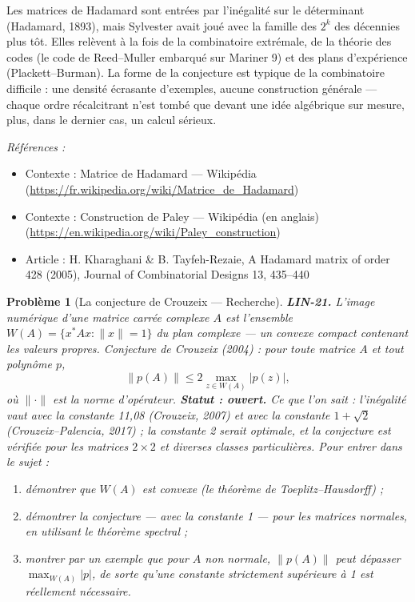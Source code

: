 \documentclass[11pt]{article}
\newtheorem{problem}{Problème}
\newenvironment{refs}{\par\small\noindent\emph{Références :}\begin{itemize}\setlength\itemsep{0pt}}{\end{itemize}\normalsize}
\begin{document}
\noindent Les matrices de Hadamard sont entrées par l'inégalité sur le déterminant (Hadamard,
1893), mais Sylvester avait joué avec la famille des $2^k$ des décennies plus tôt. Elles relèvent à
la fois de la combinatoire extrémale, de la théorie des codes (le code de Reed--Muller embarqué sur
Mariner 9) et des plans d'expérience (Plackett--Burman). La forme de la conjecture est typique de la
combinatoire difficile : une densité écrasante d'exemples, aucune construction générale --- chaque ordre
récalcitrant n'est tombé que devant une idée algébrique sur mesure, plus, dans le dernier cas, un
calcul sérieux.

\begin{refs}
\item Contexte : Matrice de Hadamard --- Wikipédia (\url{https://fr.wikipedia.org/wiki/Matrice_de_Hadamard})
\item Contexte : Construction de Paley --- Wikipédia (en anglais) (\url{https://en.wikipedia.org/wiki/Paley_construction})
\item Article : H. Kharaghani \& B. Tayfeh-Rezaie, \og{} A Hadamard matrix of order 428 \fg{} (2005), Journal of Combinatorial Designs 13, 435--440
\end{refs}

\bigskip

\begin{problem}[{La conjecture de Crouzeix --- Recherche}]
\textbf{LIN-21.} L'\textit{image numérique} d'une matrice carrée complexe
$A$ est l'ensemble $W(A) = \{ x^* A x : \|x\| = 1 \}$ du plan complexe --- un convexe compact
contenant les valeurs propres. Conjecture de Crouzeix (2004) : pour toute matrice $A$ et tout
polynôme $p$,
\[ \| p(A) \| \le 2 \max_{z \in W(A)} |p(z)|, \]
où $\|\cdot\|$ est la norme d'opérateur. \textbf{Statut : ouvert.} Ce que l'on sait : l'inégalité vaut
avec la constante 11,08 (Crouzeix, 2007) et avec la constante $1 + \sqrt{2}$ (Crouzeix--Palencia,
2017) ; la constante 2 serait optimale, et la conjecture est vérifiée pour les matrices
$2 \times 2$ et diverses classes particulières. Pour entrer dans le sujet :
\begin{enumerate}
\item[(i)] démontrer que $W(A)$ est convexe (le
théorème de Toeplitz--Hausdorff) ;
\item[(ii)] démontrer la conjecture --- avec la constante 1 --- pour les matrices normales,
en utilisant le théorème spectral ;
\item[(iii)] montrer par un exemple que pour $A$ non normale, $\|p(A)\|$ peut
dépasser $\max_{W(A)} |p|$, de sorte qu'une constante strictement supérieure à 1 est réellement
nécessaire.
\end{enumerate}

\end{problem}
\end{document}
